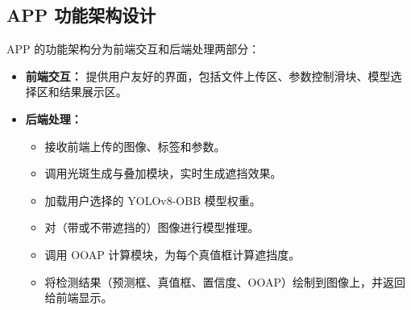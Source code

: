 \documentclass[12pt, a4paper]{report}
\begin{document}
\subsection{APP 功能架构设计}
APP 的功能架构分为前端交互和后端处理两部分：
\begin{itemize}
    \item \textbf{前端交互：} 提供用户友好的界面，包括文件上传区、参数控制滑块、模型选择区和结果展示区。
    \item \textbf{后端处理：}
    \begin{itemize}
        \item 接收前端上传的图像、标签和参数。
        \item 调用光斑生成与叠加模块，实时生成遮挡效果。
        \item 加载用户选择的 YOLOv8-OBB 模型权重。
        \item 对（带或不带遮挡的）图像进行模型推理。
        \item 调用 OOAP 计算模块，为每个真值框计算遮挡度。
        \item 将检测结果（预测框、真值框、置信度、OOAP）绘制到图像上，并返回给前端显示。
    \end{itemize}
\end{itemize}
\end{document}
